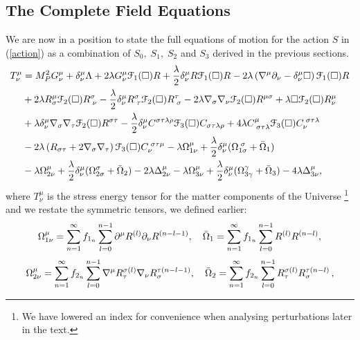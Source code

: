 \subsection{The Complete Field Equations}
We are now in a position to state the full equations of motion for the action $S$ in
(\ref{action}) as a combination of $S_0,\;S_1,\;S_2$ and $S_3$ derived in the previous sections.
\begin{align}
\label{eomfull}
T_{\nu}^{\mu}	&=	M_{P}^{2}G_{\nu}^{\mu}+\delta_{\nu}^{\mu}\Lambda+2\lambda G_{\nu}^{\mu}{\cal F}_{1}(\Box)R+\frac{\lambda}{2}\delta_{\nu}^{\mu}R{\cal F}_{1}(\Box)R-2\lambda\left(\nabla^{\mu}\partial_{\nu}-\delta_{\nu}^{\mu}\square\right){\cal F}_{1}(\Box)R
		\nonumber\\&+2\lambda R_{\sigma}^{\mu}{\cal F}_{2}(\Box)R_{\;\nu}^{\sigma}-\frac{\lambda}{2}\delta_{\nu}^{\mu}R_{\;\tau}^{\sigma}{\cal F}_{2}(\Box)R_{\;\sigma}^{\tau}-2\lambda\nabla_{\sigma}\nabla_{\nu}{\cal F}_{2}(\Box)R^{\mu\sigma}+\lambda\square{\cal F}_{2}(\Box)R_{\nu}^{\mu}
		\nonumber\\&+\lambda\delta_{\nu}^{\mu}\nabla_{\sigma}\nabla_{\tau}{\cal F}_{2}(\Box)R^{\sigma\tau}-\frac{\lambda}{2}\delta_{\nu}^{\mu}C^{\sigma\tau\lambda\rho}{\cal F}_{3}(\Box)C_{\sigma\tau\lambda\rho}+4\lambda C_{\;\sigma\tau\lambda}^{\mu}{\cal {\cal F}}_{3}(\square)C_{\nu}^{\;\sigma\tau\lambda}
		\nonumber\\&-2\lambda\left(R_{\sigma\tau}+2\nabla_{\sigma}\nabla_{\tau}\right){\cal {\cal F}}_{3}(\square)C_{\nu}^{\;\sigma\tau\mu}-\lambda\Omega_{1\nu}^{\mu}+\frac{\lambda}{2}\delta_{\nu}^{\mu}(\Omega_{1\sigma}^{\;\sigma}+\bar{\Omega}_{1})
		\nonumber\\&-\lambda\Omega_{2\nu}^{\mu}+\frac{\lambda}{2}\delta_{\nu}^{\mu}(\Omega_{2\sigma}^{\sigma}+\bar{\Omega}_{2})-2\lambda\Delta_{2\nu}^{\mu}-\lambda\Omega_{3\nu}^{\mu}+\frac{\lambda}{2}\delta_{\nu}^{\mu}(\Omega_{3\gamma}^{\gamma}+\bar{\Omega}_{3})-4\lambda\Delta_{3\nu}^{\mu},
   \end{align}
where $T^\mu_{\nu}$ is the stress energy tensor for the matter components of the Universe \footnote{We have lowered an index for convenience when analysing perturbations later in the text.} and we restate the symmetric tensors, we defined earlier:
\[\nonumber
\label{Omegas}
\Omega_{1\nu}^{\mu}=\sum_{n=1}^{\infty}f_{1_{n}}\sum_{l=0}^{n-1}\partial^{\mu}R^{(l)}\partial_{\nu}R^{(n-l-1)},\quad\bar{\Omega}_{1}=\sum_{n=1}^{\infty}f_{1_{n}}\sum_{l=0}^{n-1}R^{(l)}R^{(n-l)},
 \]
\[\nonumber
\Omega_{2\nu}^{\mu}=\sum_{n=1}^{\infty}f_{2_{n}}\sum_{l=0}^{n-1}\nabla^{\mu}R_{\tau}^{\sigma(l)}\nabla_{\nu}R_{\sigma}^{\tau(n-l-1)},\quad\bar{\Omega}_{2}=\sum_{n=1}^{\infty}f_{2_{n}}\sum_{l=0}^{n-1}R_{\tau}^{\sigma(l)}R_{\sigma}^{\tau(n-l)}\,,
 \]
